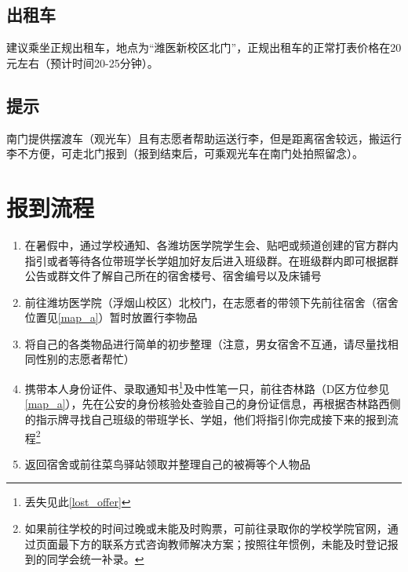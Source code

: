 \subsection[出租车]{出租车}
建议乘坐正规出租车，地点为“潍医新校区北门”，正规出租车的正常打表价格在20元左右（预计时间20-25分钟）。

\subsection[提示]{提示}
南门提供摆渡车（观光车）且有志愿者帮助运送行李，但是距离宿舍较远，搬运行李不方便，可走北门报到（报到结束后，可乘观光车在南门处拍照留念）。

\section[报到流程]{报到流程}
\begin{enumerate}
    \item 在暑假中，通过学校通知、各潍坊医学院学生会、贴吧或频道创建的官方群内指引或者等待各位带班学长学姐加好友后进入班级群。在班级群内即可根据群公告或群文件了解自己所在的宿舍楼号、宿舍编号以及床铺号
    \item 前往潍坊医学院（浮烟山校区）北校门，在志愿者的带领下先前往宿舍（宿舍位置见\uline{\ref{map_a}}）暂时放置行李物品
    \item 将自己的各类物品进行简单的初步整理（注意，男女宿舍不互通，请尽量找相同性别的志愿者帮忙）
    \item 携带本人身份证件、录取通知书\footnote{丢失见此\uline{\ref{lost_offer}}}及中性笔一只，前往杏林路（D区方位参见\uline{\ref{map_a}}），先在公安的身份核验处查验自己的身份证信息，再根据杏林路西侧的指示牌寻找自己班级的带班学长、学姐，他们将指引你完成接下来的报到流程\footnote{如果前往学校的时间过晚或未能及时购票，可前往录取你的学校学院官网，通过页面最下方的联系方式咨询教师解决方案；按照往年惯例，未能及时登记报到的同学会统一补录。}
    \item 返回宿舍或前往菜鸟驿站领取并整理自己的被褥等个人物品
\end{enumerate}